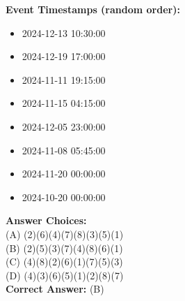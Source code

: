 \begin{ReasoningBox}[title=Temporal Relation Reasoning]
\noindent \textbf{Event Timestamps (random order):}
\begin{itemize}
    \item 2024-12-13 10:30:00
    \item 2024-12-19 17:00:00
    \item 2024-11-11 19:15:00
    \item 2024-11-15 04:15:00
    \item 2024-12-05 23:00:00
    \item 2024-11-08 05:45:00
    \item 2024-11-20 00:00:00
    \item 2024-10-20 00:00:00
\end{itemize}
    \vspace{0.5em}
    \textbf{Answer Choices:} \\ (A) (2)(6)(4)(7)(8)(3)(5)(1) \\ (B) (2)(5)(3)(7)(4)(8)(6)(1) \\ (C) (4)(8)(2)(6)(1)(7)(5)(3) \\ (D) (4)(3)(6)(5)(1)(2)(8)(7) \\
    \textbf{Correct Answer:} \textcolor{correctgreen}{(B)} \\
\end{ReasoningBox}